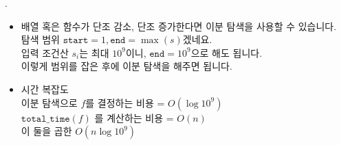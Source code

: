 \begin{frame}{\textbf{\pletter}. \ptitle}
    \begin{itemize}
        \item 배열 혹은 함수가 단조 감소, 단조 증가한다면 이분 탐색을 사용할 수 있습니다.\\
        탐색 범위 $\texttt{start}=1, \texttt{end}=\max(s)$겠네요.\\
        입력 조건산 $s_i$는 최대 $10^9$이니, $\texttt{end}=10^9$으로 해도 됩니다.\\
        이렇게 범위를 잡은 후에 이분 탐색을 해주면 됩니다.

        \item 시간 복잡도\\
        이분 탐색으로 $f$를 결정하는 비용 = $O(\log 10^9)$\\
        $\texttt{total\_time}(f)$ 를 계산하는 비용 = $O(n)$\\
        이 둘을 곱한 $O(n \log 10^9)$
    \end{itemize}
\end{frame}
